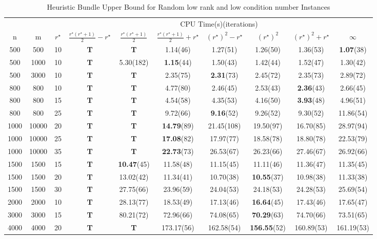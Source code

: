 \documentclass{jcmlatex}
\begin{document}
\begin{table}
    \centering
    \caption{Heuristic Bundle Upper Bound for Random low rank and low condition number Instances}
    \label{t3}
    \setlength\tabcolsep{0.9pt}
    \begin{tabular*}{\textwidth}{@{\extracolsep\fill}cccccccccc}
\toprule 
~&~&~& \multicolumn{7}{c}{CPU Time(s)(iterations)}  \\ 
\cmidrule{4-10}
n&m&\(r^{\star}\)&\(\frac{r^{\star}(r^{\star}+1)}{2}-r^{\star}\)&\(\frac{r^{\star}(r^{\star}+1)}{2}\)&\(\frac{r^{\star}(r^{\star}+1)}{2}+r^{\star}\)&\((r^{\star})^2-r^{\star}\)&\((r^{\star})^2\)&\((r^{\star})^2+r^{\star}\)&\(\infty\) \\
\midrule    
500&500&10&\textbf{T} &\textbf{T} &1.14(46) &1.27(51) &1.26(50)&1.36(53)&\textbf{1.07}(38) \\
500&1000&10&\textbf{T}&5.30(182)&\textbf{1.15}(44)&1.50(43)&1.42(44)&1.52(47)&1.30(42)\\
500&3000&10&\textbf{T} &\textbf{T} &2.35(75) &\textbf{2.31}(73) &2.45(72)&2.35(73)&2.89(72) \\
\midrule   
800&800&10&\textbf{T} &\textbf{T}  &4.77(80) &2.46(45) &2.53(43) &\textbf{2.36}(43) &2.66(45) \\
800&800&15&\textbf{T}&\textbf{T}&4.54(58)&4.35(53)&4.16(50)&\textbf{3.93}(48)&4.96(51)\\
800&800&25&\textbf{T} &\textbf{T}  &9.72(66) &\textbf{9.16}(52) &9.26(52) &9.30(52) &11.86(54) \\
\midrule  
1000&10000&20&\textbf{T} &\textbf{T} &\textbf{14.79}(89) &21.45(108) &19.50(97) & 16.70(85)&28.97(94) \\
1000&10000&25&\textbf{T}&\textbf{T} &\textbf{17.08}(82)&17.97(77)&18.58(78)&18.80(78)&22.53(79)\\
1000&10000&35&\textbf{T} &\textbf{T} &\textbf{22.73}(73) &26.53(67) &26.23(66) & 27.46(67)&26.92(66) \\
\midrule  
1500&1500&15&\textbf{T}&\textbf{10.47}(45)&11.58(48)&11.15(45)&11.11(46)&11.36(47)&11.35(45)\\
1500&1500&20&\textbf{T}&13.02(42)&11.34(41)&10.70(38)&\textbf{10.55}(37)&10.98(38)&11.33(38)\\
1500&1500&30&\textbf{T}&27.75(66)&23.96(59)&24.04(53)&24.18(53)&24.28(53)&25.69(54)\\
\midrule 
2000&2000&10&\textbf{T}&28.13(77)&18.53(49)&17.13(46)&\textbf{16.64}(45)&17.43(46)&17.65(47)\\
3000&3000&15&\textbf{T}&80.21(72)&72.96(66)&74.08(65)&\textbf{70.29}(63)&74.70(66)&73.51(65)\\
4000&4000&20&\textbf{T}&\textbf{T} &173.17(56) &162.58(54) &\textbf{156.55}(52) &160.89(53) &161.19(53)\\
\hline
\end{tabular*}
\end{table}
\end{document}
